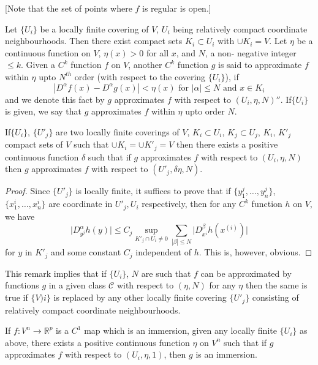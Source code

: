 [Note that the set of points where $f$ is regular is open.]
 
Let $\{ U_i\}$ be a locally finite covering of $V$, $U_i$ being
relatively compact coordinate neighbourhoods. Then there exist compact
sets $K_i \subset U_i$ with $\cup K_i = V$. Let $\eta$ be a continuous
function on $V$, $\eta (x)> 0$ for all $x$, and $N$, a non- negative
integer $\leq k$. Given a $C^k$ function $f$ on $V$, another $C^k$
function $g$ is said to approximate $f$ within $\eta$ upto $N^{th}$
order (with respect to the covering $\{ U_i \}$), if  
$$
|D^\alpha f(x) - D^\alpha g(x) | < \eta (x) \text{ for } |\alpha| \leq
N \text{ and } x \in K_i 
$$
and we denote this fact by  $g$ approximates $f$ with respect to $(U_i
, \eta, N)''$. If\pageoriginale $\{U_i \}$ is given, we say that $g$ approximates $f$
within $\eta$ upto order $N$.  

\begin{remark*} 
  If$ \{ U_i \}$, $\{ U'_j \}$ are two locally finite coverings of $V$,
  $K_i \subset U_i$, $K_j \subset U_j$, $K_i$, $K'_j$ compact sets of
  $V$ such that $\cup K_i = \cup K'_j = V$ then there exists a
  positive continuous function $\delta$ such that if $g$ approximates
  $f$ with respect to $(U_i , \eta , N)$ then $g$ approximates $f$
  with respect to $(U'_j , \delta \eta ,N)$. 
\end{remark*}
 
\begin{proof}
  Since $\{U'_j \}$ is locally finite, it suffices to prove that if
  $\{y^j_1, \ldots, y^j_n \}$, $\{x^i_1, \ldots , x^i_n \}$ are
  coordinate in $U'_j, U_i$ respectively, then for any $C^k$ function
  $h$ on $V$, we have 
  $$
  \bigg| D^\alpha_{y^j} h(y) \bigg| \leq C_j \sup_{K'_j \cap U_i \neq
    0} \sum_{|\beta| \leq N} \bigg| D^\beta_{x^i} h(x^{(i)}) \bigg| 
  $$
  for $y$ in $K'_j$ and some constant $C_j$ independent of $h$. This
  is, however, obvious. 
\end{proof} 

This remark implies that if $\{ U_i \}$, $N$ are such that $f$ can be
approximated by functions $g$ in a given class $\mathscr{C}$ with respect to
$(\eta, N)$ for any $\eta$ then the same is true if $\{V)i \}$ is
replaced by any other locally finite covering $\{U'_j \}$ consisting
of relatively compact coordinate neighbourhoods. 

\setcounter{proposition}{0}
\begin{proposition}\label{chap2:sec9:prop1}%
  If  $f: V^n \rightarrow \mathbb{R}^p$ is a $C^1$ map which is an
  immersion, given any locally finite $\{U_i\}$ as above, there exists
  a positive continuous function $\eta$ on $V^n$ such that if $g$
  approximates $f$ with respect to $(U_i, \eta , 1)$, then $g$ is an
  immersion. 
\end{proposition}
 
